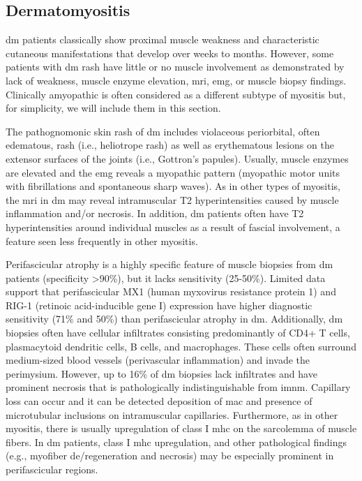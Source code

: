 \subsection{Dermatomyositis}

\gls{dm} patients classically show proximal muscle weakness and characteristic cutaneous manifestations that develop over weeks to months. However, some patients with \gls{dm} rash have little or no muscle involvement as demonstrated by lack of weakness, muscle enzyme elevation, \gls{mri}, \gls{emg}, or muscle biopsy findings. Clinically amyopathic is often considered as a different subtype of myositis\cite{Sontheimer2002} but, for simplicity, we will include them in this section.

The pathognomonic skin rash of \gls{dm} includes violaceous periorbital, often edematous, rash (i.e., heliotrope rash) as well as erythematous lesions on the extensor surfaces of the joints (i.e., Gottron’s papules). Usually, muscle enzymes are elevated and the \gls{emg} reveals a myopathic pattern (myopathic motor units with fibrillations and spontaneous sharp waves). As in other types of myositis, the \gls{mri} in \gls{dm} may reveal intramuscular T2 hyperintensities caused by muscle inflammation and/or necrosis.\cite{PinalFernandez2017} In addition, \gls{dm} patients often have T2 hyperintensities around individual muscles as a result of fascial involvement, a feature seen less frequently in other myositis.\cite{PinalFernandez2017} 

Perifascicular atrophy is a highly specific feature of muscle biopsies from \gls{dm} patients (specificity >90\%), but it lacks sensitivity (25-50\%).\cite{SuarezCalvet2017,PinalFernandez2015} Limited data support that perifascicular MX1 (human myxovirus resistance protein 1) and RIG-1 (retinoic acid-inducible gene I) expression have higher diagnostic sensitivity (71\% and 50\%) than perifascicular atrophy in \gls{dm}.\cite{SuarezCalvet2017,Uruha2017} Additionally, \gls{dm} biopsies often have cellular infiltrates consisting predominantly of CD4+ T cells, plasmacytoid dendritic cells, B cells, and macrophages.\cite{Dalakas2002} These cells often surround medium-sized blood vessels (perivascular inflammation) and invade the perimysium.\cite{Dalakas2002} However, up to 16\% of \gls{dm} biopsies lack infiltrates and have prominent necrosis that is pathologically indistinguishable from \gls{imnm}.\cite{PinalFernandez2015} Capillary loss can occur and it can be detected deposition of \gls{mac} and presence of microtubular inclusions on intramuscular capillaries.\cite{Dalakas2002} Furthermore, as in other myositis, there is usually upregulation of class I \gls{mhc} on the sarcolemma of muscle fibers. In \gls{dm} patients, class I \gls{mhc} upregulation, and other pathological findings (e.g., myofiber de/regeneration and necrosis) may be especially prominent in perifascicular regions.\cite{Dalakas2002}

